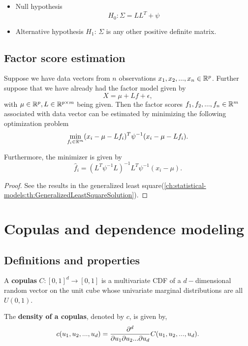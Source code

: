 \begin{refsection}
\begin{definition}\cite[495]{johnson2007applied}

\begin{itemize}
	\item Null hypothesis
	$$H_0: \Sigma = LL^T + \psi$$
	\item Alternative hypothesis
	$H_1$: $\Sigma$ is any other positive definite matrix. 
\end{itemize}	
\end{definition}


\subsection{Factor score estimation}

\begin{lemma}
Suppose we have data vectors from $n$ observations $x_1,x_2,...,x_n \in \mathbb{R}^p$. Further suppose that we have already had the factor model given by
$$X = \mu + Lf + \epsilon,$$
with $\mu\in \mathbb{R}^p, L\in \mathbb{R}^{p\times m}$ being given.
Then the factor scores $f_1,f_2,...,f_n \in \mathbb{R}^m$ associated with data vector can be estimated by minimizing the following optimization problem
$$\min_{f_i\in\mathbb{R}^m} (x_i - \mu - Lf_i)^T\psi^{-1}(x_i - \mu - Lf_i).$$

Furthermore, the minimizer is given by
$$\hat{f}_i = (L^T\psi^{-1}L)^{-1}L^T\psi^{-1}(x_i-\mu).$$
\end{lemma}
\begin{proof}
See the results in the generalized least square(\autoref{ch:statistical-models:th:GeneralizedLeastSquareSolution}).	
\end{proof}

\section{Copulas and dependence modeling}
\subsection{Definitions and properties}
\begin{definition}
A \textbf{copulas} $C:[0,1]^d\to [0,1]$ is a multivariate CDF of a $d-$dimensional random vector on the unit cube whose univariate marginal distributions are all $U(0,1)$.

The \textbf{density of a copulas}, denoted by $c$, is given by,
$$c(u_1,u_2,...,u_d) = \frac{\partial^d}{\partial u_1\partial u_2... \partial u_d}C(u_1,u_2,...,u_d).$$  
\end{definition}


\end{refsection}
